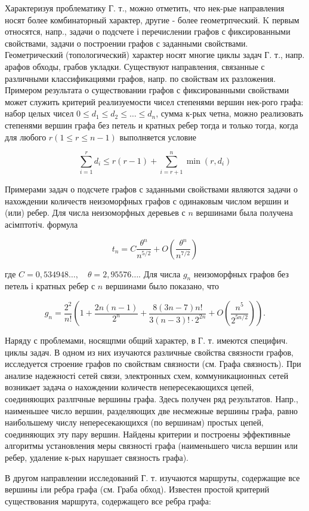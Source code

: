 \documentclass[10pt]{article}
\begin{document}
Характеризуя проблематику Г. т., можно отметить, что нек-рые направления носят более комбинаторный характер, другие - более геометрпческий. $\mathrm{K}$ первым относятся, напр., задачи о подсчете і перечислении графов с фиксированными свойствами, задачи о построении графов с заданными свойствами. Геометрический (топологический) характер носят многие циклы задач Г. т., напр. арафов обходы, грабов укладки. Существуют направления, связанные с различными классификациями графов, напр. по свойствам их разложения. Примером результата о существовании графов с фиксированными свойствами может служить критерий реализуемости чисел степенями вершин нек-рого графа: набор целых чисел $0 \leqslant d_{1} \leqslant d_{2} \leqslant \ldots \leqslant d_{n}$, сумма к-рых четна, можно реализовать степенями вершин графа без петель и кратных ребер тогда и только тогда, когда для любого $r(1 \leqslant r \leqslant n-1)$ выполняется условие



\[

\sum_{i=1}^{r} d_{i} \leqslant r(r-1)+\sum_{i=r+1}^{n} \min \left(r, d_{i}\right)

\]



Примерами задач о подсчете графов с заданными свойствами являются задачи о нахождении количеств неизоморфных графов с одинаковым числом вершин и (или) ребер. Для числа неизоморфных деревьев с $n$ вершинами была получена асімптотіч. формула



\[

t_{n}=C \frac{\theta^{n}}{n^{5 / 2}}+O\left(\frac{\theta^{n}}{n^{7 / 2}}\right)

\]



где $C=0,534948 \ldots, \quad \theta=2,95576 \ldots$. Для числа $g_{n}$ неизоморфных графов без петель і кратных ребер с $n$ вершинами было показано, что



\[

g_{n}=\frac{2^{2}}{n !}\left(1+\frac{2 n(n-1)}{2^{n}}+\frac{8(3 n-7) n !}{3(n-3) ! \cdot 2^{2 n}}+O\left(\frac{n^{5}}{2^{5 n / 2}}\right)\right) .

\]



Наряду с проблемами, носящпми общий характер, в Г. т. имеются специфич. циклы задач. В одном из них изучаются различные свойства связности графов, исследуется строение графов по свойствам связности (см. Графа связность). При анализе надежності сетей связи, электронных схем, коммуникационных сетей возникает задача о нахождении количеств непересекающихся цепей, соединяющих разлпчные вершины графа. Здесь получен ряд результатов. Напр., наименьшее число вершин, разделяющих две несмежные вершины графа, равно наибольшему числу непересекающихся (по вершинам) простых цепей, соединяющих эту пару вершин. Найдены критерии и построены эффективные алгоритмы установления меры связності графа (наименьшего числа вершин или ребер, удаление к-рых нарушает связность графа).



В другом направлении исследований Г. т. изучаются маршруты, содержащие все вершины іли ребра графа (см. Граба обход). Известен простой критерий существования маршрута, содержащего все ребра графа:
\end{document}

